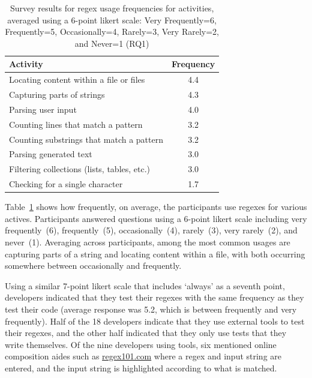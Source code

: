 \begin{table}
\caption{Survey results for regex usage frequencies for  activities, averaged using a 6-point likert scale: Very Frequently=6, Frequently=5, Occasionally=4, Rarely=3, Very Rarely=2, and Never=1 (RQ1)\label{tab:regexactivities}}
\begin{center}
\begin{small}
\begin{tabular}{l|c}
\toprule
\textbf{Activity} & \textbf{Frequency} \\  \hline \bigstrut
Locating content within a file or files & 4.4\\ \hline \bigstrut
Capturing parts of strings & 4.3 \\ \hline \bigstrut
Parsing user input & 4.0\\ \hline \bigstrut
Counting lines that match a pattern & 3.2\\ \hline \bigstrut
Counting  substrings that match a pattern & 3.2\\  \hline \bigstrut
Parsing generated text & 3.0\\  \hline \bigstrut
Filtering collections (lists, tables, etc.) & 3.0 \\ \hline \bigstrut
Checking for a single character & 1.7\\
\bottomrule
\end{tabular}
\end{small}
\end{center}
\vspace{-12pt}
\end{table}

Table~\ref{tab:regexactivities} shows how frequently, on average, the participants use
regexes for various actives.
Participants answered questions using a 6-point likert scale including very frequently~(6), frequently~(5), occasionally~(4), rarely~(3), very rarely~(2), and never~(1).
Averaging across participants, among the most common usages are capturing parts of a string and locating content within a file, with both occurring somewhere between occasionally and frequently.

Using a similar 7-point likert scale that includes `always' as a seventh point, developers indicated that they test their regexes with the same frequency as they test their code (average response was 5.2, which is between frequently and very frequently).  Half of the 18 developers indicate that they use external tools to test their regexes, and the other half indicated that they only use tests that they write themselves. Of the nine developers using tools, six mentioned online composition aides such as \url{regex101.com} where a regex and input string are entered, and the input string is highlighted according to what is matched.

